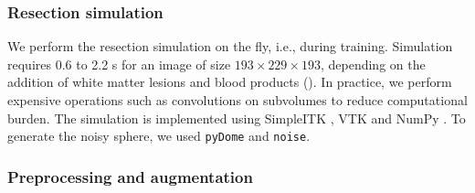 \subsubsection{Resection simulation}

We perform the resection simulation on the fly, i.e., during training.
Simulation requires 0.6 to 2.2 s for an image of size $193 \times 229 \times 193$, depending on the addition of white matter lesions and blood products ().
In practice, we perform expensive operations such as convolutions on subvolumes to reduce computational burden.
The simulation is implemented using SimpleITK \cite{lowekamp_design_2013}, VTK \cite{schroeder_visualization_2006} and NumPy \cite{van_der_walt_numpy_2011}.
To generate the noisy sphere, we used \texttt{pyDome} and \texttt{noise}.


\subsubsection{Preprocessing and augmentation}
\label{sec:preprocessing_augmentation}

